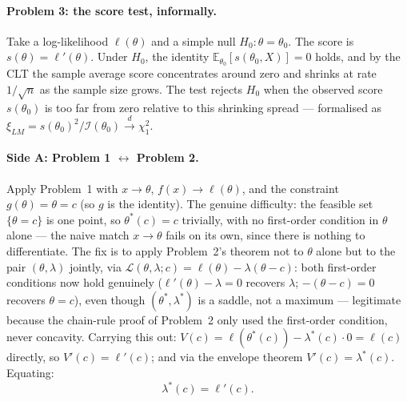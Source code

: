 \documentclass[a4paper,oneside,12pt]{extarticle}
\theoremstyle{plain}
\theoremstyle{definition}
\theoremstyle{remark}
\newcommand*{\E}{\mathbb{E}}
\begin{document}
\paragraph{Problem 3: the score test, informally.}
Take a log-likelihood $\ell(\theta)$ and a simple null
$H_0:\theta=\theta_0$. The score is $s(\theta)=\ell'(\theta)$. Under
$H_0$, the identity $\E_{\theta_0}[s(\theta_0,X)]=0$ holds, and by
the CLT the sample average score concentrates around zero and
shrinks at rate $1/\sqrt{n}$ as the sample size grows. The test
rejects $H_0$ when the observed score $s(\theta_0)$ is too far from
zero relative to this shrinking spread --- formalised as
$\xi_{LM}=s(\theta_0)^2/\mathcal{I}(\theta_0)\xrightarrow{d}\chi^2_1$.

\paragraph{Side A: Problem 1 $\leftrightarrow$ Problem 2.}
Apply Problem~1 with $x\to\theta$, $f(x)\to\ell(\theta)$, and the
constraint $g(\theta)=\theta=c$ (so $g$ is the identity). The
genuine difficulty: the feasible set $\{\theta=c\}$ is one point, so
$\theta^*(c)=c$ trivially, with no first-order condition in $\theta$
alone --- the naive match $x\to\theta$ fails on its own, since there
is nothing to differentiate. The fix is to apply Problem~2's theorem
not to $\theta$ alone but to the pair $(\theta,\lambda)$ jointly,
via $\mathcal{L}(\theta,\lambda;c)=\ell(\theta)-\lambda(\theta-c)$:
both first-order conditions now hold genuinely
($\ell'(\theta)-\lambda=0$ recovers $\lambda$; $-(\theta-c)=0$
recovers $\theta=c$), even though $(\theta^*,\lambda^*)$ is a
saddle, not a maximum --- legitimate because the chain-rule proof of
Problem~2 only used the first-order condition, never concavity.
Carrying this out: $V(c)=\ell(\theta^*(c))-\lambda^*(c)\cdot 0=\ell(c)$
directly, so $V'(c)=\ell'(c)$; and via the envelope theorem
$V'(c)=\lambda^*(c)$. Equating:
\[
  \boxed{\ \lambda^*(c) = \ell'(c).\ }
\]
\end{document}
